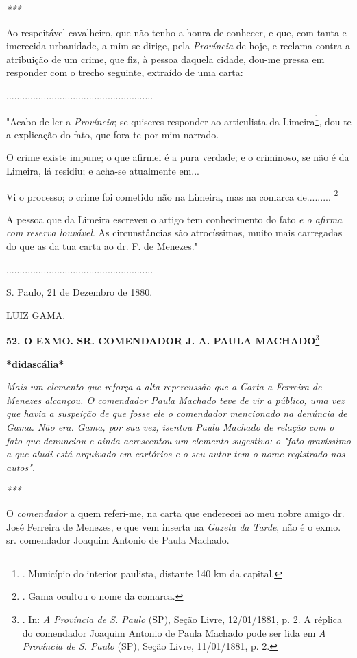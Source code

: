 \emph{***}

Ao respeitável cavalheiro, que não tenho a honra de conhecer, e que, com
tanta e imerecida urbanidade, a mim se dirige, pela \emph{Província} de
hoje, e reclama contra a atribuição de um crime, que fiz, à pessoa
daquela cidade, dou-me pressa em responder com o trecho seguinte,
extraído de uma carta:

.......................................................

"Acabo de ler a \emph{Província}; se quiseres responder ao articulista
da Limeira\footnote{. Município do interior paulista, distante 140 km da
  capital.}, dou-te a explicação do fato, que fora-te por mim narrado.

O crime existe impune; o que afirmei é a pura verdade; e o criminoso, se
não é da Limeira, lá residiu; e acha-se atualmente em...

Vi o processo; o crime foi cometido não na Limeira, mas na comarca
de......... \footnote{. Gama ocultou o nome da comarca.}

A pessoa que da Limeira escreveu o artigo tem conhecimento do fato
\emph{e o afirma com reserva louvável}. As circunstâncias são
atrocíssimas, muito mais carregadas do que as da tua carta ao dr. F. de
Menezes."

.......................................................

S. Paulo, 21 de Dezembro de 1880.

LUIZ GAMA.

\textbf{52. O EXMO. SR. COMENDADOR J. A. PAULA MACHADO}\footnote{. In:
  \emph{A Província de S. Paulo} (SP), Seção Livre, 12/01/1881, p. 2. A
  réplica do comendador Joaquim Antonio de Paula Machado pode ser lida
  em \emph{A Província de S. Paulo} (SP), Seção Livre, 11/01/1881, p. 2.}

\textbf{*}\textbf{didascália*}

\emph{Mais um elemento que reforça a alta repercussão que a Carta a
Ferreira de Menezes alcançou. O comendador Paula Machado teve de vir a
público, uma vez que havia a suspeição de que fosse ele o comendador
mencionado na denúncia de Gama. Não era. Gama, por sua vez, isentou
Paula Machado de relação com o fato que denunciou e ainda acrescentou um
elemento sugestivo: o "fato gravíssimo a que aludi está arquivado em
cartórios e o seu autor tem o nome registrado nos autos". }

\emph{***}

O \emph{comendador} a quem referi-me, na carta que enderecei ao meu
nobre amigo dr. José Ferreira de Menezes, e que vem inserta na
\emph{Gazeta da Tarde}, não é o exmo. sr. comendador Joaquim Antonio de
Paula Machado.

